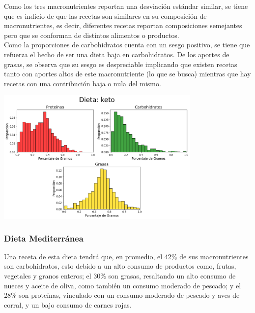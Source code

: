 \documentclass[12pt,a4paper]{article}
\begin{document}
            Como los tres macronutrientes reportan una desviación estándar similar, 
            se tiene que es indicio de que las recetas son similares en su composición 
            de macronutrientes, es decir, diferentes recetas reportan composiciones 
            semejantes pero que se conforman de distintos alimentos o productos.\\

            Como la proporciones de carbohidratos cuenta con un sesgo positivo, se 
            tiene que refuerza el hecho de ser una dieta baja en carbohidratos. 
            De los aportes de grasas, se observa que su sesgo es despreciable implicando 
            que existen recetas tanto con aportes altos de este macronutriente (lo que se 
            busca) mientras que hay recetas con una contribución baja o nula del mismo.
            
            \begin{center}
                \includegraphics[width=0.75\textwidth]{Resources/2_03_plot_02.png}
            \end{center}

        \subsubsection{Dieta Mediterránea}

            Una receta de esta dieta tendrá que, en promedio, el $42\%$ de sus 
            macronutrientes son carbohidratos, esto debido a un alto consumo de 
            productos como, frutas, vegetales y granos enteros; el $30\%$ son 
            grasas, resaltando un alto consumo de nueces y aceite de oliva, como 
            también un consumo moderado de pescado; y el $28\%$ son proteínas, 
            vinculado con un consumo moderado de pescado y aves de corral, y un 
            bajo consumo de carnes rojas.\\
\end{document}
